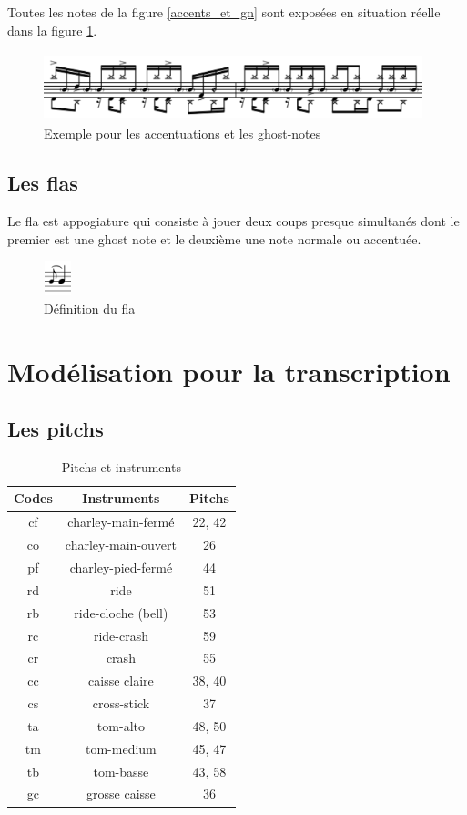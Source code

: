 Toutes les notes de la figure \ref{accents_et_gn} sont exposées en situation
réelle dans la figure \ref{exemple_acc_et_gn}. 
\begin{figure}[h]
	\centering
	\includegraphics[height=20mm, width=110mm]{z_images/3_methodes/0_notation_de_la_batterie/8_accents_et_ghost-notes_1.png}
	\caption{Exemple pour les accentuations et les ghost-notes}
	\label{exemple_acc_et_gn}
\end{figure}

\subsection*{Les flas}
Le fla est appogiature qui consiste à jouer deux coups presque simultanés dont
le premier est une ghost note et le deuxième une note normale ou accentuée.
\begin{figure}[h]
    \centering
    \includegraphics[height=10mm, width=8mm]{z_images/3_methodes/0_notation_de_la_batterie/fla_def.png}
    \caption{Définition du fla}
\end{figure}
\section{Modélisation pour la transcription}
\label{modelisation_transcription}
\subsection*{Les pitchs}
\begin{table}[h]
	\centering
	\begin{tabular}{|c|c|c|} \hline
		Codes & Instruments & Pitchs \\ \hline
		cf & charley-main-fermé & 22, 42 \\
		co & charley-main-ouvert & 26 \\
		pf & charley-pied-fermé & 44 \\
		rd & ride & 51 \\
		rb & ride-cloche (bell) & 53 \\
		rc & ride-crash & 59 \\
		cr & crash & 55 \\
		cc & caisse claire & 38, 40 \\
		cs & cross-stick & 37 \\
		ta & tom-alto & 48, 50 \\
		tm & tom-medium & 45, 47 \\
		tb & tom-basse & 43, 58 \\
		gc & grosse caisse & 36 \\ \hline
	\end{tabular}
	\caption{Pitchs et instruments}
	\label{pitchs_instru}
\end{table}

